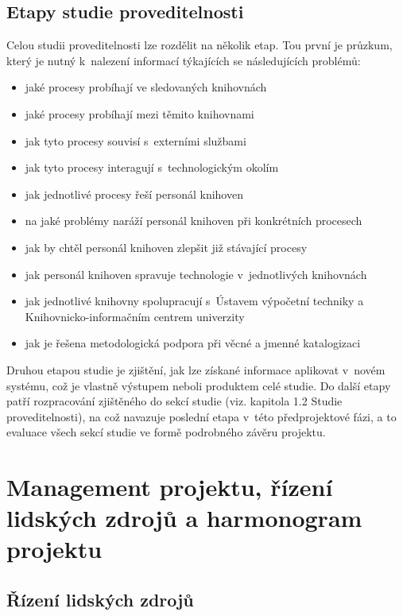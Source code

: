 \documentclass[
	11pt, oneside, printed, draft, 
	table,   %
	lof,     %
	lot     %
]{fithesis3}
\begin{document}
{\subsection{Etapy studie proveditelnosti}

Celou studii proveditelnosti lze rozdělit na několik etap. Tou první je průzkum, který je nutný k~nalezení informací týkajících se následujících problémů:

\begin{itemize}
\item jaké procesy probíhají ve sledovaných knihovnách
\item jaké procesy probíhají mezi těmito knihovnami
\item jak tyto procesy souvisí s~externími službami
\item jak tyto procesy interagují s~technologickým okolím
\item jak jednotlivé procesy řeší personál knihoven
\item na jaké problémy naráží personál knihoven při konkrétních procesech
\item jak by chtěl personál knihoven zlepšit již stávající procesy
\item jak personál knihoven spravuje technologie v~jednotlivých knihovnách
\item jak jednotlivé knihovny spolupracují s~Ústavem výpočetní techniky a Knihovnicko-informačním centrem univerzity
\item jak je řešena metodologická podpora při věcné a jmenné katalogizaci
\end{itemize}

Druhou etapou studie je zjištění, jak lze získané informace aplikovat v~novém systému, což je vlastně výstupem neboli produktem celé studie. Do další etapy patří rozpracování zjištěného do sekcí studie (viz. kapitola 1.2 Studie proveditelnosti), na což navazuje poslední etapa v~této předprojektové fázi, a to evaluace všech sekcí studie ve formě podrobného závěru projektu. %

\section{Management projektu, řízení lidských zdrojů a harmonogram projektu}

\subsection{Řízení lidských zdrojů}

}
\end{document}
